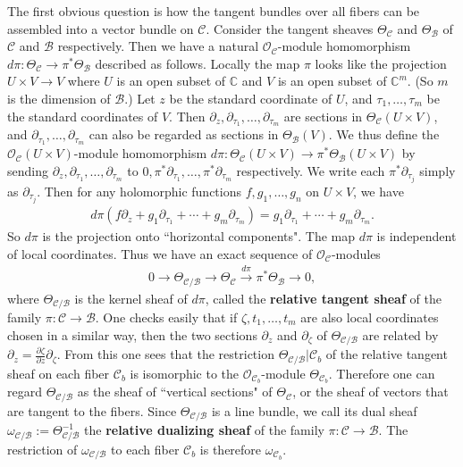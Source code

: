 \documentclass[12pt,a4paper,notitlepage]{report}
\theoremstyle{definition}
\theoremstyle{plain}
\newcommand{\mc}{\mathcal}
\newcommand{\scr}{\mathscr}
\numberwithin{equation}{section}
\begin{document}
The first obvious question is how  the tangent bundles over all fibers can be assembled into a vector bundle on $\mc C$. Consider the tangent sheaves $\Theta_{\mc C}$ and $\Theta_{\mc B}$ of $\mc C$ and $\mc B$ respectively. Then we have a natural $\scr O_{\mc C}$-module homomorphism $d\pi:\Theta_{\mc C}\rightarrow\pi^*\Theta_{\mc B}$ described as follows. Locally the map $\pi$ looks like the projection $U\times V\rightarrow V$ where $U$ is an open subset of $\mathbb C$ and $V$ is an open subset of $\mathbb C^m$. (So $m$ is the dimension of $\mc B$.)  Let $z$ be the standard coordinate of $U$, and $\tau_1,\dots,\tau_m$ be the standard coordinates of $V$. Then $\partial_z,\partial_{\tau_1},\dots,\partial_{\tau_m}$ are sections in $\Theta_{\mc C}(U\times V)$, and  $\partial_{\tau_1},\dots,\partial_{\tau_m}$ can also be regarded as sections in $\Theta_{\mc B}(V)$.  We thus define the $\scr O_{\mc C}(U\times V)$-module homomorphism $d\pi:\Theta_{\mc C}(U\times V)\rightarrow\pi^*\Theta_{\mc B}(U\times V)$ by sending $\partial_z,\partial_{\tau_1},\dots,\partial_{\tau_m}$ to  $0,\pi^*\partial_{\tau_1},\dots,\pi^*\partial_{\tau_m}$ respectively. We write each $\pi^*\partial_{\tau_j}$ simply as $\partial_{\tau_j}$. Then for any holomorphic functions $f,g_1,\dots,g_n$ on $U\times V$, we have
\begin{align}
d\pi(f\partial_z+g_1\partial_{\tau_1}+\cdots+g_m\partial_{\tau_m})=g_1\partial_{\tau_1}+\cdots+g_m\partial_{\tau_m}.
\end{align} 
So $d\pi$ is the projection onto  ``horizontal components". The map $d\pi$ is independent of local coordinates. Thus we have an exact sequence of $\scr O_{\mc C}$-modules
\begin{align}
0\rightarrow \Theta_{\mc C/\mc B}\rightarrow \Theta_{\mc C}\xrightarrow{d\pi}\pi^*\Theta_{\mc B}\rightarrow 0,\label{eq81}
\end{align}
where $\Theta_{\mc C/\mc B}$ is the kernel sheaf of $d\pi$, \index{zz@$\Theta_{\mc C/\mc B}$} called the \textbf{relative tangent sheaf} of the family $\pi:\mc C\rightarrow\mc B$. One checks easily that if $\zeta,t_1,\dots,t_m$ are also local  coordinates chosen in a similar way, then the two sections $\partial_z$ and $\partial_\zeta$ of $\Theta_{\mc C/\mc B}$ are related by $\partial_z=\frac{\partial\zeta}{\partial z}\partial_\zeta$. From this one sees that  the restriction $\Theta_{\mc C/\mc B}|\mc C_b$ of the relative tangent sheaf on each fiber $\mc C_b$ is isomorphic to the $\scr O_{\mc C_b}$-module $\Theta_{\mc C_b}$. Therefore one can regard $\Theta_{\mc C/\mc B}$ as the sheaf of ``vertical sections" of $\Theta_{\mc C}$, or the sheaf of vectors that are tangent to the fibers. Since $\Theta_{\mc C/\mc B}$ is a line bundle, we call its dual sheaf $\omega_{\mc C/\mc B}:=\Theta_{\mc C/\mc B}^{-1}$ \index{zz@$\omega_{\mc C/\mc B}$} the \textbf{relative dualizing sheaf} of the family $\pi:\mc C\rightarrow\mc B$. The restriction of $\omega_{\mc C/\mc B}$ to each fiber $\mc C_b$ is therefore $\omega_{\mc C_b}$.
\end{document}
